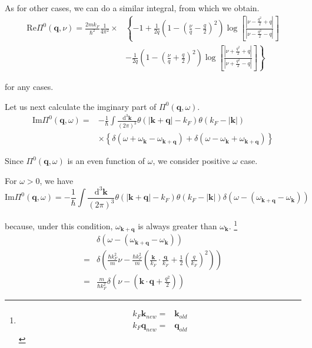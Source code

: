 As for other cases, we can do a similar integral, from which we obtain.
\begin{equation} \label{Eqs2.8.20}
\begin{split}\text{Re} \Pi^0(\mathbf{q},\nu)
= \frac{2 m k_F}{\hbar^2} \frac{1}{4\pi^2} \times&\left\{ -1 + \frac{1}{2q}\left( 1-(\frac{\nu}{q}-\frac{q}{2})^2 \right) \log\left[ \frac{|\nu-\frac{q^2}{2}+q|}{|\nu-\frac{q^2}{2}-q|} \right] \right. \\
&\left. -\frac{1}{2q}\left( 1-(\frac{\nu}{q}+\frac{q}{2})^2 \right) \log\left[ \frac{|\nu+\frac{q^2}{2}+q|}{|\nu+\frac{q^2}{2}-q|} \right] \right\}
\end{split}
\end{equation}

for any cases.

Let us next calculate the imginary part of $\Pi^0(\mathbf{q},\omega)$.
\begin{equation*} \tag{2.8.16} \begin{split}
\text{Im} \Pi^0(\mathbf{q},\omega) =& -\frac{1}{\hbar} \int \frac{\mathrm{d}^3 \mathbf{k}}{(2\pi)^3} \theta(|\mathbf{k}+\mathbf{q}|-k_F)\theta(k_F - |\mathbf{k}|)\\
& \times \left\{ \delta(\omega+\omega_{\mathbf{k}}- \omega_{\mathbf{k}+\mathbf{q}}) + \delta(\omega-\omega_{\mathbf{k}}+ \omega_{\mathbf{k}+\mathbf{q}}) \right\}
\end{split}\end{equation*}

Since $\Pi^0(\mathbf{q},\omega)$ is an even function of $\omega$, we consider positive $\omega$ case.

For $\omega > 0$, we have
\[
\text{Im} \Pi^0(\mathbf{q},\omega) = -\frac{1}{\hbar} \int \frac{\mathrm{d}^3 \mathbf{k}}{(2\pi)^3} \theta(|\mathbf{k}+\mathbf{q}|-k_F)\theta(k_F - |\mathbf{k}|) \delta(\omega-(\omega_{\mathbf{k}+\mathbf{q}} - \omega_{\mathbf{k}}))
\]

because, under this condition, $\omega_{\mathbf{k}+\mathbf{q}}$ is always greater than $\omega_{\mathbf{k}}$.
\footnote{\[\begin{split}k_F\mathbf{k}_{new} =& \mathbf{k}_{old}\\
k_F \mathbf{q}_{new} =& \mathbf{q}_{old}\end{split}\]}
\[\begin{split} &\delta(\omega - (\omega_{\mathbf{k}+\mathbf{q}} - \omega_{\mathbf{k}})) \\=& \delta(\frac{\hbar k_F^2}{m}\nu - \frac{\hbar k_F^2}{m}(\frac{\mathbf{k}}{k_F}\cdot \frac{\mathbf{q}}{k_F} + \frac{1}{2}\left( \frac{q}{k_F} \right)^2) )\\
=& \frac{m}{\hbar k_F^2} \delta(\nu - (\mathbf{k}\cdot \mathbf{q} + \frac{q^2}{2}))
\end{split}\]

